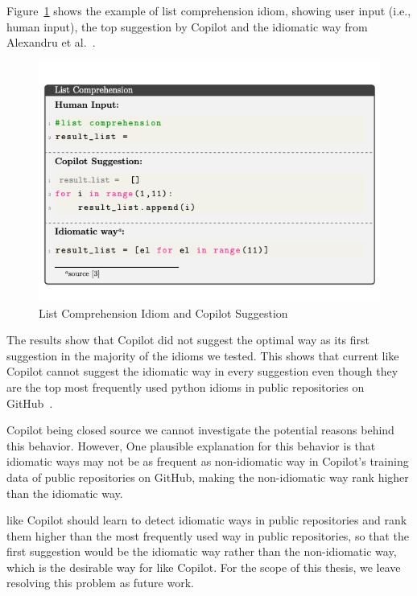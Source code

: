 Figure~\ref{fig:idioms_1} shows the example of list comprehension idiom, showing user input (i.e., human input), the top suggestion by Copilot and the idiomatic way from Alexandru et al.~\cite{Alexandru2018}.

\begin{figure}[hbt!]
    \centering
    \includegraphics[width=\linewidth]{Figures/idioms_1.png}
    \caption{List Comprehension Idiom and Copilot Suggestion}
    \label{fig:idioms_1}
\end{figure}

The results show that Copilot did not suggest the optimal way as its first suggestion in the majority of the idioms we tested. This shows that current \cct{} like Copilot cannot suggest the idiomatic way in every suggestion even though they are the top most frequently used python idioms in public repositories on GitHub~\cite{Alexandru2018}. 

Copilot being closed source we cannot investigate the potential reasons behind this behavior. However, One plausible explanation for this behavior is that idiomatic ways may not be as frequent as non-idiomatic way in Copilot's training data of public repositories on GitHub, making the non-idiomatic way rank higher than the idiomatic way.

\cct{} like Copilot should learn to detect idiomatic ways in public repositories and rank them higher than the most frequently used way in public repositories, so that the first suggestion would be the idiomatic way rather than the non-idiomatic way, which is the desirable way for \cct{} like Copilot. For the scope of this thesis, we leave resolving this problem as future work.

